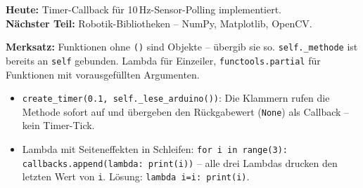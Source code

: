 \begin{projektBox}
\textbf{Heute:} Timer-Callback für 10\,Hz-Sensor-Polling implementiert.\\
\textbf{Nächster Teil:} Robotik-Bibliotheken -- NumPy, Matplotlib, OpenCV.
\end{projektBox}

\begin{merksatzBox}
\textbf{Merksatz:} Funktionen ohne \texttt{()} sind Objekte -- übergib sie so.
\texttt{self.\_methode} ist bereits an \texttt{self} gebunden.
Lambda für Einzeiler, \texttt{functools.partial} für Funktionen
mit vorausgefüllten Argumenten.
\end{merksatzBox}

\begin{fehlerBox}
\begin{itemize}
\item \texttt{create\_timer(0.1, self.\_lese\_arduino())}:
  Die Klammern rufen die Methode sofort auf und übergeben den
  Rückgabewert (\texttt{None}) als Callback -- kein Timer-Tick.
\item Lambda mit Seiteneffekten in Schleifen:
  \texttt{for i in range(3): callbacks.append(lambda: print(i))} --
  alle drei Lambdas drucken den letzten Wert von \texttt{i}.
  Lösung: \texttt{lambda i=i: print(i)}.
\end{itemize}
\end{fehlerBox}
